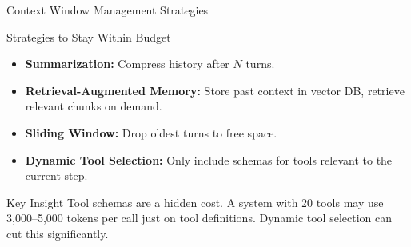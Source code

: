 \documentclass{beamer}       %
\begin{document}
\begin{frame}{Context Window Management Strategies}
    \begin{block}{Strategies to Stay Within Budget}
        \begin{itemize}
            \item \textbf{Summarization:} Compress history after $N$ turns.
            \item \textbf{Retrieval-Augmented Memory:} Store past context in vector DB, retrieve relevant chunks on demand.
            \item \textbf{Sliding Window:} Drop oldest turns to free space.
            \item \textbf{Dynamic Tool Selection:} Only include schemas for tools relevant to the current step.
        \end{itemize}
    \end{block}
    \vfill
    \begin{alertblock}{Key Insight}
        Tool schemas are a hidden cost. A system with 20 tools may use 3,000--5,000 tokens per call just on tool definitions. Dynamic tool selection can cut this significantly.
    \end{alertblock}
\end{frame}
\end{document}

